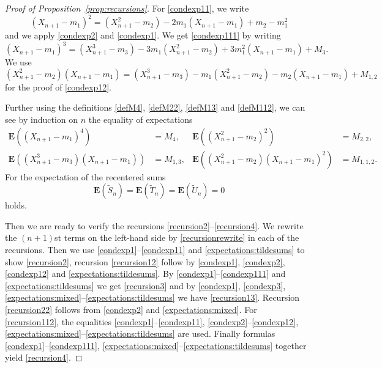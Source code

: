 \documentclass[12pt,a4paper]{article}
\newcommand{\E}{\mathbf E}
\newcommand{\wt}{\widetilde}
\numberwithin{equation}{section}
\begin{document}
\begin{proof}[Proof of Proposition~\ref{prop:recursions}]
For \eqref{condexp11}, we write
\begin{equation}
(X_{n+1}-m_1)^2=(X_{n+1}^2-m_2)-2m_1(X_{n+1}-m_1)+m_2-m_1^2
\end{equation}
and we apply \eqref{condexp2} and \eqref{condexp1}.
We get \eqref{condexp111} by writing
\begin{equation}
(X_{n+1}-m_1)^3=(X_{n+1}^3-m_3)-3m_1(X_{n+1}^2-m_2)+3m_1^2(X_{n+1}-m_1)+M_3.
\end{equation}
We use
\begin{equation}
(X_{n+1}^2-m_2)(X_{n+1}-m_1)=(X_{n+1}^3-m_3)-m_1(X_{n+1}^2-m_2)-m_2(X_{n+1}-m_1)+M_{1,2}
\end{equation}
for the proof of \eqref{condexp12}.

Further using the definitions \eqref{defM4}, \eqref{defM22}, \eqref{defM13} and \eqref{defM112}, we can see by induction on $n$ the equality of expectations
\begin{equation}\label{expectations:mixed}\begin{aligned}
\E((X_{n+1}-m_1)^4)&=M_4,&\E((X_{n+1}^2-m_2)^2)&=M_{2,2},\\
\E((X_{n+1}^3-m_3)(X_{n+1}-m_1))&=M_{1,3},&\E((X_{n+1}^2-m_2)(X_{n+1}-m_1)^2)&=M_{1,1,2}.
\end{aligned}\end{equation}
For the expectation of the recentered sums
\begin{equation}\label{expectations:tildesums}
\E(\wt S_n)=\E(\wt T_n)=\E(\wt U_n)=0
\end{equation}
holds.

Then we are ready to verify the recursions \eqref{recursion2}--\eqref{recursion4}.
We rewrite the $(n+1)$st terms on the left-hand side by \eqref{recursionrewrite} in each of the recursions.
Then we use \eqref{condexp1}--\eqref{condexp11} and \eqref{expectations:tildesums} to show \eqref{recursion2},
recursion \eqref{recursion12} follow by \eqref{condexp1}, \eqref{condexp2}, \eqref{condexp12} and \eqref{expectations:tildesums}.
By \eqref{condexp1}--\eqref{condexp111} and \eqref{expectations:tildesums} we get \eqref{recursion3}
and by \eqref{condexp1}, \eqref{condexp3}, \eqref{expectations:mixed}--\eqref{expectations:tildesums} we have \eqref{recursion13}.
Recursion \eqref{recursion22} follows from \eqref{condexp2} and \eqref{expectations:mixed}.
For \eqref{recursion112}, the equalities \eqref{condexp1}--\eqref{condexp11}, \eqref{condexp2}--\eqref{condexp12},
\eqref{expectations:mixed}--\eqref{expectations:tildesums} are used.
Finally formulas \eqref{condexp1}--\eqref{condexp111}, \eqref{expectations:mixed}--\eqref{expectations:tildesums} together yield \eqref{recursion4}.
\end{proof}
\end{document}
